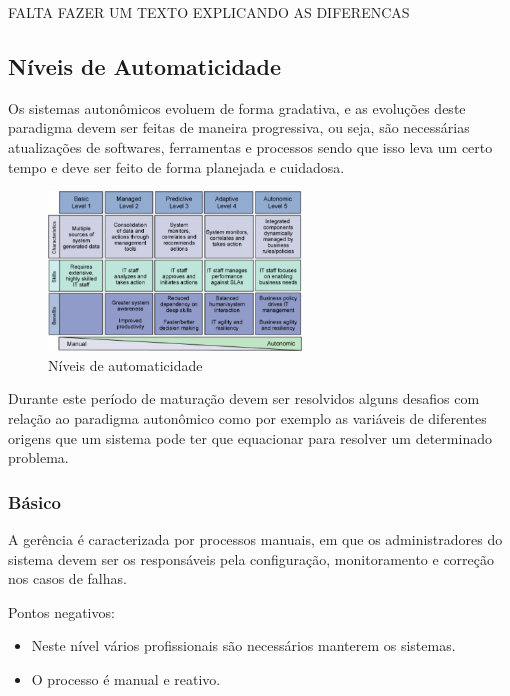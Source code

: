 \documentclass[11pt,twoside]{article}
\begin{document}

FALTA FAZER UM TEXTO EXPLICANDO AS DIFERENCAS

\subsection{Níveis de Automaticidade}
Os sistemas autonômicos evoluem de forma gradativa, e as evoluções deste paradigma devem ser feitas de maneira progressiva, ou seja, são necessárias atualizações de softwares, ferramentas e processos sendo que isso leva um certo tempo e deve ser feito de forma planejada e cuidadosa. 
\begin{figure}
    \centering
    \includegraphics[width=0.6\textwidth]{Picture2.png}
	\caption{Níveis de automaticidade}
    \label{Sec:Intro:Fig2}
\end{figure}
Durante este período de maturação devem ser resolvidos alguns desafios com relação ao paradigma autonômico como por exemplo as variáveis de diferentes origens que um sistema pode ter que equacionar para resolver um determinado problema. 

\subsubsection{Básico}
A gerência é caracterizada por processos manuais, em que os administradores do sistema devem ser os responsáveis pela configuração, monitoramento e correção nos casos de falhas. 

Pontos negativos: 
\begin{itemize}
\item Neste nível vários profissionais são necessários manterem os sistemas.
\item O processo é manual e reativo.
\end{itemize}
\end{document}
